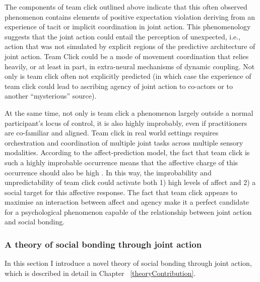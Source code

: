 \begin{CJK}{UTF8}{gbsn}

The components of team click outlined above indicate that this often observed phenomenon contains elements of positive expectation violation deriving from an experience of tacit or implicit coordination in joint action.  This phenomenology suggests that the joint action could entail the perception of unexpected, i.e., action that was not simulated by explicit regions of the predictive architecture of joint action.  Team Click could be a mode of movement coordination that relies heavily, or at least in part, in extra-neural mechanisms of dynamic coupling.  Not only is team click often not explicitly predicted (in which case the experience of team click could lead to ascribing agency of joint action to co-actors or to another ``mysterious'' source).


At the same time, not only is team click a phenomenon largely outside a normal participant's locus of control, it is also highly improbably, even if practitioners are co-familiar and aligned.  Team click in real world settings requires orchestration and coordination of multiple joint tasks across multiple sensory modalities.
According to the affect-prediction model, the fact that team click is such a highly improbable occurrence means that the affective charge of this occurrence should also be high \citep{Chetverikov2016}.  In this way, the improbability and unpredictability of team click could activate both 1) high levels of affect and 2) a social target for this affective response.  The fact that team click appears to maximise an interaction between affect and agency make it a perfect candidate for a psychological phenomenon capable of the relationship between joint action and social bonding.






\subsubsection{A theory of social bonding through joint action}

In this section I introduce a novel theory of social bonding through joint action, which is described in detail in Chapter ~\ref{theoryContribution}.




\end{CJK}
